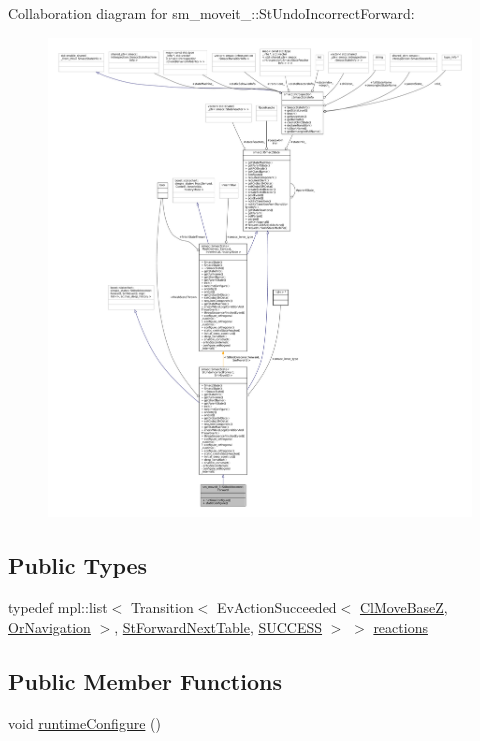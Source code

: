 Collaboration diagram for sm\+\_\+moveit\+\_\+:\+:St\+Undo\+Incorrect\+Forward\+:
\nopagebreak
\begin{figure}[H]
\begin{center}
\leavevmode
\includegraphics[width=350pt]{structsm__moveit__3_1_1StUndoIncorrectForward__coll__graph}
\end{center}
\end{figure}
\subsection*{Public Types}
\begin{DoxyCompactItemize}
\item 
typedef mpl\+::list$<$ Transition$<$ Ev\+Action\+Succeeded$<$ \hyperlink{classcl__move__base__z_1_1ClMoveBaseZ}{Cl\+Move\+BaseZ}, \hyperlink{classsm__moveit__3_1_1OrNavigation}{Or\+Navigation} $>$, \hyperlink{structsm__moveit__3_1_1StForwardNextTable}{St\+Forward\+Next\+Table}, \hyperlink{classSUCCESS}{S\+U\+C\+C\+E\+SS} $>$ $>$ \hyperlink{structsm__moveit__3_1_1StUndoIncorrectForward_ab5d1a2ebae967e534c963656042537bf}{reactions}
\end{DoxyCompactItemize}
\subsection*{Public Member Functions}
\begin{DoxyCompactItemize}
\item 
void \hyperlink{structsm__moveit__3_1_1StUndoIncorrectForward_a4fc3d6fb5bc494f82a4abad6c255eff0}{runtime\+Configure} ()
\end{DoxyCompactItemize}

